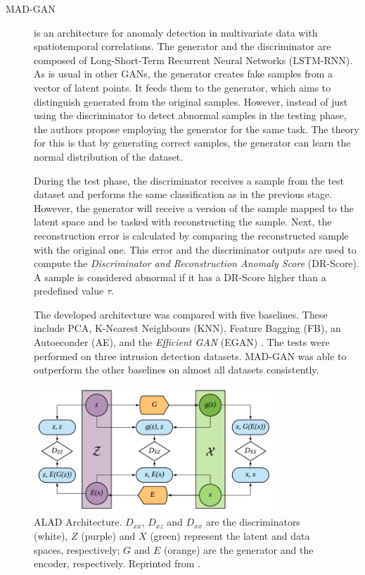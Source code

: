 \begin{description}
    \item[MAD-GAN \cite{li.etal_MADGANMultivariateAnomaly_2019}] is an architecture for anomaly detection in multivariate data with spatiotemporal correlations. The generator and the discriminator are composed of Long-Short-Term Recurrent Neural Networks (LSTM-RNN). As is usual in other GANs, the generator creates fake samples from a vector of latent points. It feeds them to the generator, which aims to distinguish generated from the original samples. However, instead of just using the discriminator to detect abnormal samples in the testing phase, the authors propose employing the generator for the same task. The theory for this is that by generating correct samples, the generator can learn the normal distribution of the dataset. 
    
    During the test phase, the discriminator receives a sample from the test dataset and performs the same classification as in the previous stage. However, the generator will receive a version of the sample mapped to the latent space and be tasked with reconstructing the sample. Next, the reconstruction error is calculated by comparing the reconstructed sample with the original one. This error and the discriminator outputs are used to compute the \textit{Discriminator and Reconstruction Anomaly Score} (DR-Score). A sample is considered abnormal if it has a DR-Score higher than a predefined value $\tau$. 
    
    The developed architecture was compared with five baselines. These include PCA, K-Nearest Neighbours (KNN), Feature Bagging (FB), an Autoeconder (AE), and the \textit{Efficient GAN} (EGAN) \cite{zenati.etal_EfficientGANBasedAnomaly_2018a}. The tests were performed on three intrusion detection datasets. MAD-GAN was able to outperform the other baselines on almost all datasets consistently.
\end{description}

\begin{figure}[]
\centering
\includegraphics[width=0.8\textwidth]{figures/alad_architecture.png}
\caption[ALAD Architecture]{ALAD Architecture. $D_{xx}$, $D_{xz}$ and $D_{xx}$ are the discriminators (white), $Z$ (purple) and $X$ (green) represent the latent and data spaces, respectively; $G$ and $E$ (orange) are the generator and the encoder, respectively. Reprinted from \cite{zenati.etal_AdversariallyLearnedAnomaly_2018}.}
\label{fig:alad_arch}
\end{figure}


